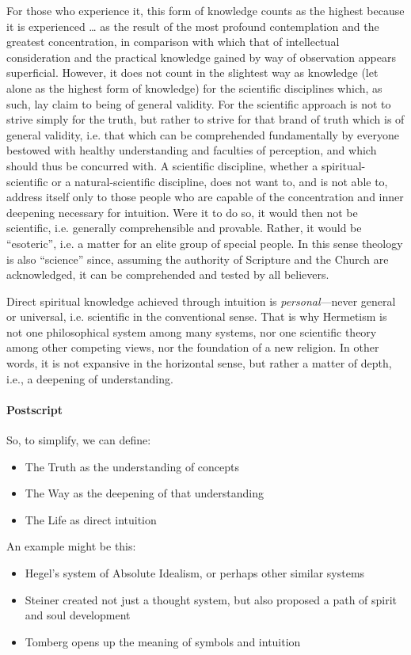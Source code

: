 \begin{quotationx}
For those who experience it, this form of knowledge counts as the highest because it is experienced … as the result of
the most profound contemplation and the greatest concentration, in comparison with which that of intellectual
consideration and the practical knowledge gained by way of observation appears superficial. However, it does not count
in the slightest way as knowledge (let alone as the highest form of knowledge) for the scientific disciplines which, as
such, lay claim to being of general validity. For the scientific approach is not to strive simply for the truth, but
rather to strive for that brand of truth which is of general validity, i.e. that which can be comprehended
fundamentally by everyone bestowed with healthy understanding and faculties of perception, and which should thus be
concurred with. A scientific discipline, whether a spiritual-scientific or a natural-scientific discipline, does not
want to, and is not able to, address itself only to those people who are capable of the concentration and inner
deepening necessary for intuition. Were it to do so, it would then not be scientific, i.e. generally comprehensible and
provable. Rather, it would be “esoteric”, i.e. a matter for an elite group of special people. In this sense theology is
also “science” since, assuming the authority of Scripture and the Church are acknowledged, it can be comprehended and
tested by all believers. 

\end{quotationx}
Direct spiritual knowledge achieved through intuition is \emph{personal}—never general or universal, i.e.
scientific in the conventional sense. That is why Hermetism is not one philosophical system among many systems, nor one
scientific theory among other competing views, nor the foundation of a new religion. In other words, it is not
expansive in the horizontal sense, but rather a matter of depth, i.e., a deepening of understanding.

\paragraph{Postscript}
So, to simplify, we can define:

\begin{itemize}
\item The Truth as the understanding of concepts 
\item The Way as the deepening of that understanding 
\item The Life as direct intuition 
\end{itemize}
An example might be this:

\begin{itemize}
\item Hegel's system of Absolute Idealism, or perhaps other similar systems 
\item Steiner created not just a thought system, but also proposed a path of spirit and soul development 
\item Tomberg opens up the meaning of symbols and intuition 
\end{itemize}

